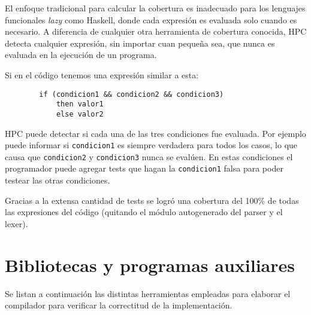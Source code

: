 El enfoque tradicional para calcular la cobertura es inadecuado para los lenguajes funcionales \emph{lazy} como Haskell, donde cada expresión es evaluada solo cuando es necesario. A diferencia de cualquier otra herramienta de cobertura conocida, HPC detecta cualquier expresión, sin importar cuan pequeña sea, que nunca es evaluada en la ejecución de un programa.
\begin{ejemplo}
    Si en el código tenemos una expresión similar a esta:
    \begin{verbatim}
        if (condicion1 && condicion2 && condicion3)
            then valor1
            else valor2
    \end{verbatim}
    HPC puede detectar si cada una de las tres condiciones fue evaluada. Por ejemplo puede informar si \texttt{condicion1} es siempre verdadera para todos los casos, lo que causa que \texttt{condicion2} y \texttt{condicion3} nunca se evalúen. En estas condiciones el programador puede agregar tests que hagan la \texttt{condicion1} falsa para poder testear las otras condiciones.
\end{ejemplo}

Gracias a la extensa cantidad de tests se logró una cobertura del 100\% de todas las expresiones del código (quitando el módulo autogenerado del parser y el lexer).


\section{Bibliotecas y programas auxiliares}\label{sec:bibliotecas}

Se listan a continuación las distintas herramientas empleadas para elaborar el compilador para verificar la correctitud de la implementación.


